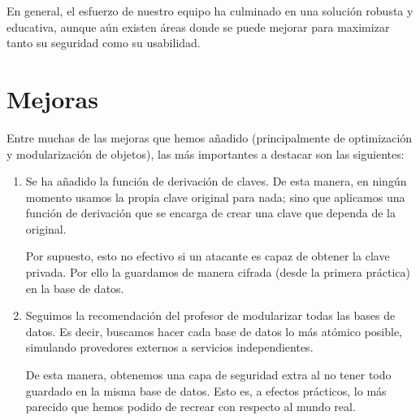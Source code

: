 \documentclass[a4paper,11pt]{article}
\begin{document}
En general, el esfuerzo de nuestro equipo ha culminado en una solución robusta y educativa, aunque aún existen áreas donde se puede mejorar para maximizar tanto su seguridad como su usabilidad.  



\section{Mejoras}
Entre muchas de las mejoras que hemos añadido (principalmente de optimización y modularización de objetos), las más importantes a destacar son las siguientes:

\begin{enumerate}
    \item Se ha añadido la función de derivación de claves. De esta manera, en ningún momento usamos la propia clave original para nada; sino que aplicamos una función de derivación que se encarga de crear una clave que dependa de la original.

    Por supuesto, esto no efectivo si un atacante es capaz de obtener la clave privada. Por ello la guardamos de manera cifrada (desde la primera práctica) en la base de datos.

    \item Seguimos la recomendación del profesor de modularizar todas las bases de datos. Es decir, buscamos hacer cada base de datos lo más atómico posible, simulando provedores externos a servicios independientes.

    De esta manera, obtenemos una capa de seguridad extra al no tener todo guardado en la misma base de datos. Esto es, a efectos prácticos, lo más parecido que hemos podido de recrear con respecto al mundo real.
\end{enumerate}
\end{document}
